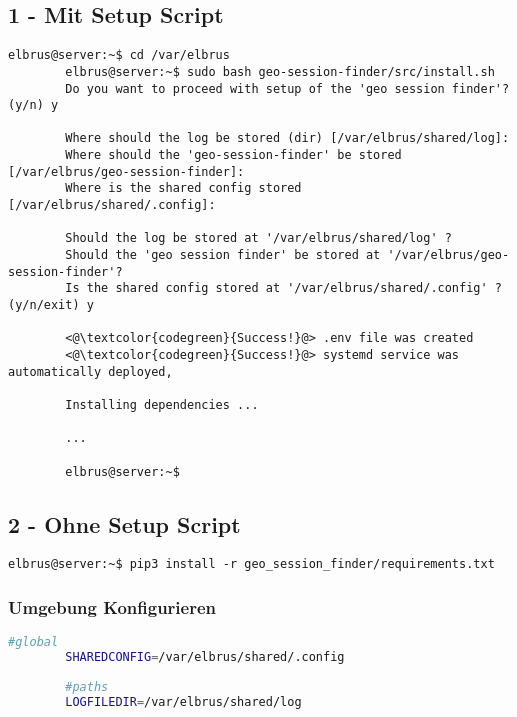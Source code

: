 	\subsection{1 - Mit Setup Script}
	
	\lstset{style=commands}
	\begin{lstlisting}[caption={Ausführen des 'install.sh' Scripts.}]
		elbrus@server:~$ cd /var/elbrus
		elbrus@server:~$ sudo bash geo-session-finder/src/install.sh
		Do you want to proceed with setup of the 'geo session finder'? (y/n) y
		
		Where should the log be stored (dir) [/var/elbrus/shared/log]:
		Where should the 'geo-session-finder' be stored [/var/elbrus/geo-session-finder]:
		Where is the shared config stored [/var/elbrus/shared/.config]:
		
		Should the log be stored at '/var/elbrus/shared/log' ?
		Should the 'geo session finder' be stored at '/var/elbrus/geo-session-finder'?
		Is the shared config stored at '/var/elbrus/shared/.config' ? (y/n/exit) y
		
		<@\textcolor{codegreen}{Success!}@> .env file was created
		<@\textcolor{codegreen}{Success!}@> systemd service was automatically deployed,
		
		Installing dependencies ...
		
		...
		
		elbrus@server:~$	
	\end{lstlisting}

	\subsection{2 - Ohne Setup Script}

	\lstset{style=commands}
	\begin{lstlisting}[caption={Installieren der Abhängigkeiten.}]
		elbrus@server:~$ pip3 install -r geo_session_finder/requirements.txt
	\end{lstlisting}

	\subsubsection[file config]{Umgebung Konfigurieren}
	\lstset{style=files}
	\begin{lstlisting}[caption={Anhand von '.env.example' eigene '.env' Datei anlegen.}, language=bash]
		#global
		SHAREDCONFIG=/var/elbrus/shared/.config
		
		#paths
		LOGFILEDIR=/var/elbrus/shared/log
	\end{lstlisting}
	\newpage
	
